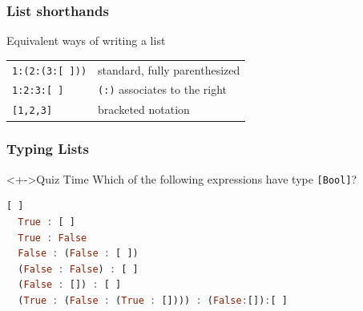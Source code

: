 \documentclass{beamer}
\begin{document}
\begin{frame}
  \frametitle{List shorthands}
  \begin{block}{Equivalent ways of writing a list}
    \begin{flushleft}
      \begin{tabular}{l@{\qquad---\qquad}l}
        \lstinline{1:(2:(3:[ ]))}& standard, fully parenthesized\\
        \lstinline{1:2:3:[ ]} & \lstinline{(:)} associates to the right\\
        \lstinline{[1,2,3]} &  bracketed notation
      \end{tabular}
    \end{flushleft}
  \end{block}
\end{frame}

\begin{frame}[fragile]
  \frametitle{Typing Lists}
\begin{alertblock}<+->{Quiz Time}
    Which of the following expressions have type \lstinline{[Bool]}?
\begin{lstlisting}[language=Haskell]
  [ ]
  True : [ ]
  True : False
  False : (False : [ ])
  (False : False) : [ ]
  (False : []) : [ ]
  (True : (False : (True : []))) : (False:[]):[ ]
\end{lstlisting}
  \end{alertblock}
\end{frame}
\end{document}
